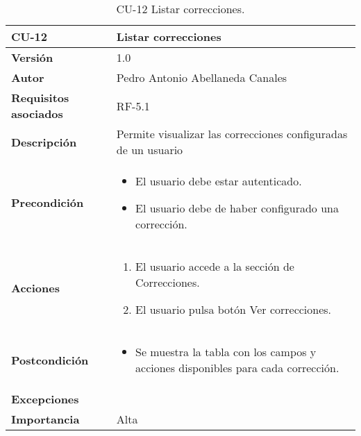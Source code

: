 \begin{table}[p]
	\centering
	\begin{tabularx}{\linewidth}{ p{} p{} }
		\toprule
		\textbf{CU-12}    & \textbf{Listar correcciones} \\
		\midrule
		\textbf{Versión}              & 1.0    \\
		\textbf{Autor}                & Pedro Antonio Abellaneda Canales \\
		\textbf{Requisitos asociados} & RF-5.1 \\
		\textbf{Descripción}          & Permite visualizar las correcciones configuradas de un usuario \\
		\textbf{Precondición}         & \begin{itemize}
                                        \tightlist
		                                  \item El usuario debe estar autenticado.
		                                  \item El usuario debe de haber configurado una corrección.
		                                 \end{itemize} \\
		\textbf{Acciones}             &
                            		\begin{enumerate}
                            			\def\labelenumi{\arabic{enumi}.}
                            			\tightlist
                            			\item El usuario accede a la sección de Correcciones.
                                        \item El usuario pulsa botón Ver correcciones.
                            		\end{enumerate} \\
		\textbf{Postcondición}        & \begin{itemize}
                                        \tightlist
		                                  \item Se muestra la tabla con los campos y acciones disponibles para cada corrección.
		                                 \end{itemize} \\
		\textbf{Excepciones}         & \\
		\textbf{Importancia}          & Alta \\
		\bottomrule
	\end{tabularx}
	\caption{CU-12 Listar correcciones.}
	\label{tab:CU-12}
\end{table}

